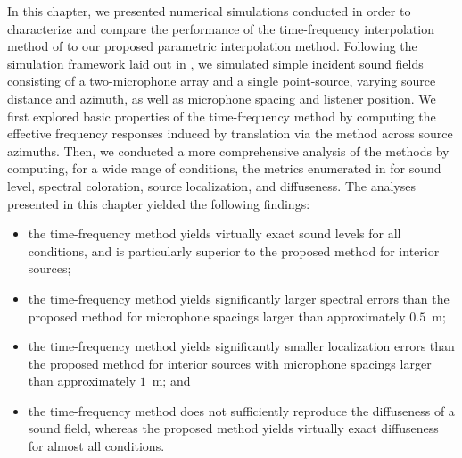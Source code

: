 In this chapter, we presented numerical simulations conducted in order to characterize and compare the performance of the time-frequency interpolation method of \citet{Thiergart2013} to our proposed parametric interpolation method.
Following the simulation framework laid out in , we simulated simple incident sound fields consisting of a two-microphone array and a single point-source, varying source distance and azimuth, as well as microphone spacing and listener position.
We first explored basic properties of the time-frequency method by computing the effective frequency responses induced by translation via the method across source azimuths.
Then, we conducted a more comprehensive analysis of the methods by computing, for a wide range of conditions, the metrics enumerated in  for sound level, spectral coloration, source localization, and diffuseness.
The analyses presented in this chapter yielded the following findings:
\begin{itemize}
\item the time-frequency method yields virtually exact sound levels for all conditions, and is particularly superior to the proposed method for interior sources;
\item the time-frequency method yields significantly larger spectral errors than the proposed method for microphone spacings larger than approximately $0.5$~m;
\item the time-frequency method yields significantly smaller localization errors than the proposed method for interior sources with microphone spacings larger than approximately $1$~m; and
\item the time-frequency method does not sufficiently reproduce the diffuseness of a sound field, whereas the proposed method yields virtually exact diffuseness for almost all conditions.
\end{itemize}


